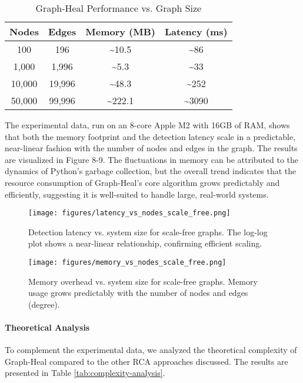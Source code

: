 \documentclass[11pt,conference]{IEEEtran}
\begin{document}
\begin{table}[h!]
\centering
\caption{Graph-Heal Performance vs. Graph Size}
\label{tab:scalability-results}
\begin{tabular}{|c|c|c|c|}
\hline
\textbf{Nodes} & \textbf{Edges} & \textbf{Memory (MB)} & \textbf{Latency (ms)} \\
\hline
100 & 196 & \textasciitilde{}10.5 & \textasciitilde{}86 \\
\hline
1,000 & 1,996 & \textasciitilde{}5.3 & \textasciitilde{}33 \\
\hline
10,000 & 19,996 & \textasciitilde{}48.3 & \textasciitilde{}252 \\
\hline
50,000 & 99,996 & \textasciitilde{}222.1 & \textasciitilde{}3090 \\
\hline
\end{tabular}
\end{table}

The experimental data, run on an 8-core Apple M2 with 16GB of RAM, shows that both the memory footprint and the detection latency scale in a predictable, near-linear fashion with the number of nodes and edges in the graph. The results are visualized in Figure 8-9. The fluctuations in memory can be attributed to the dynamics of Python's garbage collection, but the overall trend indicates that the resource consumption of Graph-Heal's core algorithm grows predictably and efficiently, suggesting it is well-suited to handle large, real-world systems.

\begin{figure}[h!]
    \centering
    \texttt{[image: figures/latency\_vs\_nodes\_scale\_free.png]}
    \caption{Detection latency vs. system size for scale-free graphs. The log-log plot shows a near-linear relationship, confirming efficient scaling.}
    \label{fig:latency-plot}
\end{figure}

\begin{figure}[h!]
    \centering
    \texttt{[image: figures/memory\_vs\_nodes\_scale\_free.png]}
    \caption{Memory overhead vs. system size for scale-free graphs. Memory usage grows predictably with the number of nodes and edges (degree).}
    \label{fig:memory-plot}
\end{figure}

\paragraph{Theoretical Analysis}
To complement the experimental data, we analyzed the theoretical complexity of Graph-Heal compared to the other RCA approaches discussed. The results are presented in Table \ref{tab:complexity-analysis}.
\end{document}
